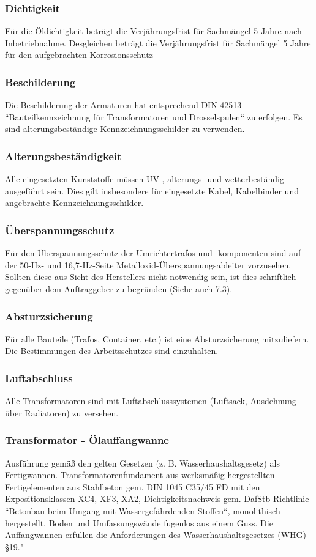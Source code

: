 \subsubsection*{Dichtigkeit}
Für die Öldichtigkeit beträgt die Verjährungsfrist für Sachmängel 5 Jahre nach Inbetriebnahme.
Desgleichen beträgt die Verjährungsfrist für Sachmängel 5 Jahre für den aufgebrachten Korrosionsschutz

\subsubsection*{Beschilderung}
Die Beschilderung der Armaturen hat entsprechend DIN 42513 “Bauteilkennzeichnung für Transformatoren und Drosselspulen“ zu erfolgen. Es sind alterungsbeständige Kennzeichnungsschilder zu verwenden.

\subsubsection*{Alterungsbeständigkeit}
Alle eingesetzten Kunststoffe müssen UV-, alterungs- und wetterbeständig ausgeführt sein. Dies gilt insbesondere für eingesetzte Kabel, Kabelbinder und angebrachte Kennzeichnungsschilder.

\subsubsection*{Überspannungsschutz}
Für den Überspannungsschutz der Umrichtertrafos und -komponenten sind auf der 50-Hz- und 16,7-Hz-Seite Metalloxid-Überspannungsableiter vorzusehen. Sollten diese aus Sicht des Herstellers nicht notwendig sein, ist dies schriftlich gegenüber dem Auftraggeber zu begründen (Siehe auch 7.3).

\subsubsection*{Absturzsicherung}
Für alle Bauteile (Trafos, Container, etc.) ist eine Absturzsicherung mitzuliefern. Die Bestimmungen des Arbeitsschutzes sind einzuhalten.

\subsubsection*{Luftabschluss}
Alle Transformatoren sind mit Luftabschlusssystemen (Luftsack, Ausdehnung über Radiatoren) zu versehen.

\subsubsection*{Transformator - Ölauffangwanne}
Ausführung gemäß den gelten Gesetzen (z. B. Wasserhaushaltsgesetz) als Fertigwannen. Transformatorenfundament aus werksmäßig hergestellten Fertigelementen aus Stahlbeton gem. DIN 1045 C35/45 FD mit den Expositionsklassen XC4, XF3, XA2, Dichtigkeitsnachweis gem. DafStb-Richtlinie “Betonbau beim Umgang mit Wassergefährdenden Stoffen“, monolithisch hergestellt, Boden und Umfassungswände fugenlos aus einem Guss. Die Auffangwannen erfüllen die Anforderungen des Wasserhaushaltsgesetzes (WHG) §19."
